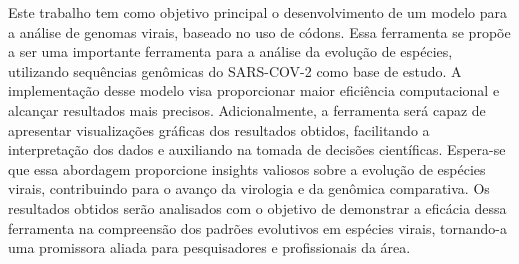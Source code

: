 Este trabalho tem como objetivo principal o desenvolvimento de um modelo para a análise de genomas virais, baseado no uso de códons. Essa ferramenta se propõe a ser uma importante ferramenta para a análise da evolução de espécies, utilizando sequências genômicas do SARS-COV-2 como base de estudo. A implementação desse modelo visa proporcionar maior eficiência computacional e alcançar resultados mais precisos. Adicionalmente, a ferramenta será capaz de apresentar visualizações gráficas dos resultados obtidos, facilitando a interpretação dos dados e auxiliando na tomada de decisões científicas. Espera-se que essa abordagem proporcione insights valiosos sobre a evolução de espécies virais, contribuindo para o avanço da virologia e da genômica comparativa. Os resultados obtidos serão analisados com o objetivo de demonstrar a eficácia dessa ferramenta na compreensão dos padrões evolutivos em espécies virais, tornando-a uma promissora aliada para pesquisadores e profissionais da área.

